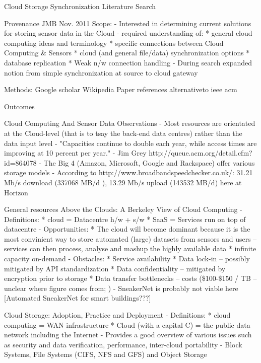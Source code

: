 Cloud Storage Synchronization Literature Search

Provenance
	JMB
	Nov. 2011
	Scope: 
		- Interested in determining current solutions for storing sensor data in the Cloud
		- required understanding of:
			* general cloud computing ideas and terminology
			* specific connections between Cloud Computing & Sensors
			* cloud (and general file/data) synchronization options
			* database replication
			* Weak n/w connection handling
		- During search expanded notion from simple synchronization at source to cloud gateway

	Methods:
			Google scholar
			Wikipedia
			Paper references
			alternativeto
			ieee
			acm

Outcomes			
	
	Cloud Computing And Sensor Data
		Observations
			- Most resources are orientated at the Cloud-level (that is to tsay the back-end data centres) rather than the data input level
			- "Capacities continue to double each year, while access times are improving at 10 percent per year." - Jim Grey http://queue.acm.org/detail.cfm?id=864078
			- The Big 4 (Amazon, Microsoft, Google and Rackspace) offer various storage models
			- According to http://www.broadbandspeedchecker.co.uk/: 31.21 Mb/s download (337068 MB/d ), 13.29 Mb/s upload (143532 MB/d) here at Horizon
		
		General resources
			Above the Clouds: A Berkeley View of Cloud Computing
				- Definitions: 	* cloud = Datacentre h/w + s/w
								* SaaS = Services run on top of datacentre
				- Opportunities:	* The cloud will become dominant because it is the most convinient way to store automated (large) datasets from sensors and users -- services can then process, analyse and mashup the highly available data 
									* infinite capacity on-demand
				- Obstacles:	* Service availability
								* Data lock-in -- possibly mitigated by API standardization
								* Data confidentiality -- mitigated by encryption prior to storage
								* Data transfer bottlenecks -- costs (\$100-\$150 / TB -- unclear where figure comes from; )
																- SneakerNet is probably not viable here [Automated SneakerNet for smart buildings???]
			
			Cloud Storage: Adoption, Practice and Deployment
				- Definitions: 	* cloud computing = WAN infrastructure
								* Cloud (with a capital C) = the public data network including the Internet
				- Provides a good overview of various issues such as security and data verification, performance, inter-cloud portability
				- Block Systems, File Systems (CIFS, NFS and GFS) and Object Storage

